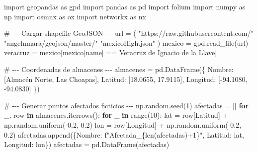 \documentclass[
  spanish,
  us-letterpaper,
]{scrreprt}
\newenvironment{Shaded}{\begin{snugshade}}{\end{snugshade}}
\newcommand{\BuiltInTok}[1]{\textcolor[rgb]{0.00,0.23,0.31}{#1}}
\newcommand{\CommentTok}[1]{\textcolor[rgb]{0.37,0.37,0.37}{#1}}
\newcommand{\ControlFlowTok}[1]{\textcolor[rgb]{0.00,0.23,0.31}{\textbf{#1}}}
\newcommand{\DecValTok}[1]{\textcolor[rgb]{0.68,0.00,0.00}{#1}}
\newcommand{\FloatTok}[1]{\textcolor[rgb]{0.68,0.00,0.00}{#1}}
\newcommand{\ImportTok}[1]{\textcolor[rgb]{0.00,0.46,0.62}{#1}}
\newcommand{\KeywordTok}[1]{\textcolor[rgb]{0.00,0.23,0.31}{\textbf{#1}}}
\newcommand{\NormalTok}[1]{\textcolor[rgb]{0.00,0.23,0.31}{#1}}
\newcommand{\OperatorTok}[1]{\textcolor[rgb]{0.37,0.37,0.37}{#1}}
\newcommand{\SpecialCharTok}[1]{\textcolor[rgb]{0.37,0.37,0.37}{#1}}
\newcommand{\SpecialStringTok}[1]{\textcolor[rgb]{0.13,0.47,0.30}{#1}}
\newcommand{\StringTok}[1]{\textcolor[rgb]{0.13,0.47,0.30}{#1}}
\numberwithin{equation}{chapter} %
\begin{document}
\begin{Shaded}
\begin{Highlighting}[]
\ImportTok{import}\NormalTok{ geopandas }\ImportTok{as}\NormalTok{ gpd}
\ImportTok{import}\NormalTok{ pandas }\ImportTok{as}\NormalTok{ pd}
\ImportTok{import}\NormalTok{ folium}
\ImportTok{import}\NormalTok{ numpy }\ImportTok{as}\NormalTok{ np}
\ImportTok{import}\NormalTok{ osmnx }\ImportTok{as}\NormalTok{ ox}
\ImportTok{import}\NormalTok{ networkx }\ImportTok{as}\NormalTok{ nx}

\CommentTok{\# {-}{-}{-} Cargar shapefile GeoJSON {-}{-}{-}}
\NormalTok{url }\OperatorTok{=}\NormalTok{ (}
    \StringTok{"https://raw.githubusercontent.com/"}
    \StringTok{"angelnmara/geojson/master/"}
    \StringTok{"mexicoHigh.json"}
\NormalTok{)}
\NormalTok{mexico }\OperatorTok{=}\NormalTok{ gpd.read\_file(url)}
\NormalTok{veracruz }\OperatorTok{=}\NormalTok{ mexico[mexico[}\StringTok{\textquotesingle{}name\textquotesingle{}}\NormalTok{] }\OperatorTok{==} \StringTok{\textquotesingle{}Veracruz de Ignacio de la Llave\textquotesingle{}}\NormalTok{]}

\CommentTok{\# {-}{-}{-} Coordenadas de almacenes {-}{-}{-}}
\NormalTok{almacenes }\OperatorTok{=}\NormalTok{ pd.DataFrame(\{}
    \StringTok{\textquotesingle{}Nombre\textquotesingle{}}\NormalTok{: [}\StringTok{\textquotesingle{}Almacén Norte\textquotesingle{}}\NormalTok{, }\StringTok{\textquotesingle{}Las Choapas\textquotesingle{}}\NormalTok{],}
    \StringTok{\textquotesingle{}Latitud\textquotesingle{}}\NormalTok{: [}\FloatTok{18.0655}\NormalTok{, }\FloatTok{17.9115}\NormalTok{],}
    \StringTok{\textquotesingle{}Longitud\textquotesingle{}}\NormalTok{: [}\OperatorTok{{-}}\FloatTok{94.1080}\NormalTok{, }\OperatorTok{{-}}\FloatTok{94.0830}\NormalTok{]}
\NormalTok{\})}

\CommentTok{\# {-}{-}{-} Generar puntos afectados ficticios {-}{-}{-}}
\NormalTok{np.random.seed(}\DecValTok{1}\NormalTok{)}
\NormalTok{afectadas }\OperatorTok{=}\NormalTok{ []}
\ControlFlowTok{for}\NormalTok{ \_, row }\KeywordTok{in}\NormalTok{ almacenes.iterrows():}
    \ControlFlowTok{for}\NormalTok{ \_ }\KeywordTok{in} \BuiltInTok{range}\NormalTok{(}\DecValTok{10}\NormalTok{):}
\NormalTok{        lat }\OperatorTok{=}\NormalTok{ row[}\StringTok{\textquotesingle{}Latitud\textquotesingle{}}\NormalTok{] }\OperatorTok{+}\NormalTok{ np.random.uniform(}\OperatorTok{{-}}\FloatTok{0.2}\NormalTok{, }\FloatTok{0.2}\NormalTok{)}
\NormalTok{        lon }\OperatorTok{=}\NormalTok{ row[}\StringTok{\textquotesingle{}Longitud\textquotesingle{}}\NormalTok{] }\OperatorTok{+}\NormalTok{ np.random.uniform(}\OperatorTok{{-}}\FloatTok{0.2}\NormalTok{, }\FloatTok{0.2}\NormalTok{)}
\NormalTok{        afectadas.append(\{}\StringTok{\textquotesingle{}Nombre\textquotesingle{}}\NormalTok{: }\SpecialStringTok{f"Afectada\_}\SpecialCharTok{\{}\BuiltInTok{len}\NormalTok{(afectadas)}\OperatorTok{+}\DecValTok{1}\SpecialCharTok{\}}\SpecialStringTok{"}\NormalTok{,}
         \StringTok{\textquotesingle{}Latitud\textquotesingle{}}\NormalTok{: lat, }\StringTok{\textquotesingle{}Longitud\textquotesingle{}}\NormalTok{: lon\})}
\NormalTok{afectadas }\OperatorTok{=}\NormalTok{ pd.DataFrame(afectadas)}


\end{Highlighting}
\end{Shaded}
\end{document}
